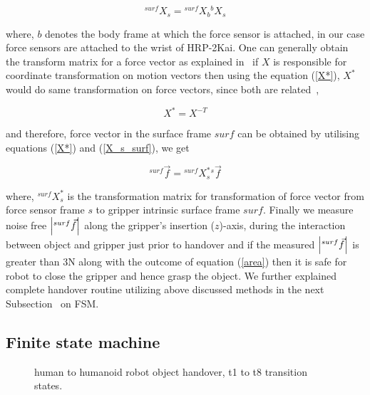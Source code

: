 \begin{equation}\label{X_s_surf}
    {}^{surf}X_{s} = {}^{surf}X_{b} {}^{b}X_s
\end{equation}

where, $b$ denotes the body frame at which the force sensor is attached, in our case force sensors are attached to the wrist of HRP-2Kai. One can generally obtain the transform matrix for a force vector as explained in~\cite{featherstone2014rigid} if $X$ is responsible for coordinate transformation on motion vectors then using the equation (\ref{X*}), $X^{*}$ would do same transformation on force vectors, since both are related~\cite{featherstone2014rigid},

\begin{equation}\label{X*}
    X^{*} = X^{-T}
\end{equation}

and therefore, force vector in the surface frame $surf$ can be obtained by utilising equations (\ref{X*}) and (\ref{X_s_surf}), we get

\begin{equation}\label{force surf}
    {}^{surf}\vec{f} = {}^{surf}X_{s}^{*} {}^s\vec{f}
\end{equation}

where, ${}^{surf}X_{s}^{*}$ is the transformation matrix for transformation of force vector from force sensor frame $s$ to gripper intrinsic surface frame $surf$. Finally we measure noise free $\abs{{}^{surf}\vec{f}}$ along the gripper's insertion ($z$)-axis, during the interaction between object and gripper just prior to handover and if the measured $\abs{{}^{surf}\vec{f}}$ is greater than 3N along with the outcome of equation (\ref{area}) then it is safe for robot to close the gripper and hence grasp the object. We further explained complete handover routine utilizing above discussed methods in the next Subsection~ on FSM.

\subsection{Finite state machine}\label{FSM}

\begin{figure}[hpt]
	\caption{human to humanoid robot object handover, t1 to t8 transition states.}
	\label{fig:h-to-r}
\end{figure}

